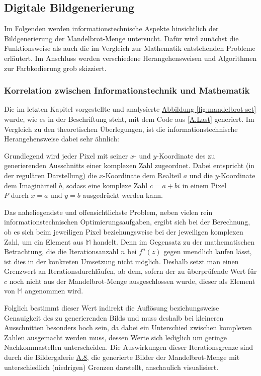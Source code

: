 \subsection{Digitale Bildgenerierung}\label{subsec:digital-generation}

Im Folgenden werden informationstechnische Aspekte hinsichtlich der Bildgenerierung
der Mandelbrot-Menge untersucht.
Dafür wird zunächst die Funktionsweise als auch die im Vergleich zur Mathematik
entstehenden Probleme erläutert.
Im Anschluss werden verschiedene Herangehensweisen und Algorithmen zur Farbkodierung
grob skizziert.

\subsubsection{Korrelation zwischen Informationstechnik und Mathematik}
\label{subsubsec:correlation-between-it-and-mathematics}

Die im letzten Kapitel vorgestellte und analysierte \hyperref[fig:mandelbrot-set]
{Abbildung \ref{fig:mandelbrot-set}} wurde,
wie es in der Beschriftung steht, mit dem Code aus \hyperref[app:last]{[A.Last]}
generiert.
Im Vergleich zu den theoretischen Überlegungen, ist die
informationstechnische Herangehensweise dabei sehr ähnlich:

Grundlegend wird jeder Pixel mit seiner $x$- und $y$-Koordinate des zu generierenden
Ausschnitts einer komplexen Zahl zugeordnet.
Dabei entspricht (in der regulären Darstellung) die $x$-Koordinate dem Realteil
$a$ und die $y$-Koordinate dem Imagin\"arteil $b$, sodass eine komplexe Zahl
$c = a + bi$ in einem Pixel $P \text{ durch } x = a \text{ und } y = b$ ausgedrückt
werden kann.

Das naheliegendste und offensichtlichste Problem,
neben vielen rein informationstechnischen Optimierungsaufgaben,
ergibt sich bei der Berechnung, ob es sich beim jeweiligen Pixel
beziehungsweise bei der jeweiligen komplexen Zahl, um ein Element aus
$\mathbb{M}$ handelt.
Denn im Gegensatz zu der mathematischen Betrachtung, die die Iterationsanzahl
$n$ bei $f^n(z)$ gegen unendlich laufen lässt, ist dies in der konkreten Umsetzung
nicht möglich.
Deshalb setzt man einen Grenzwert an Iterationsdurchläufen, ab dem, sofern der zu
überprüfende Wert für $c$ noch nicht aus der Mandelbrot-Menge ausgeschlossen wurde,
dieser als Element von $\mathbb{M}$ angenommen wird.

Folglich bestimmt dieser Wert indirekt die Auflösung beziehungsweise Genauigkeit
des zu generierenden Bilds und muss deshalb bei kleineren Ausschnitten besonders
hoch sein, da dabei ein Unterschied zwischen komplexen Zahlen ausgemacht werden
muss, dessen Werte sich lediglich um geringe Nachkommastellen unterscheiden.
Die Auswirkungen dieser Iterationsgrenze sind durch die Bildergalerie
\hyperref[app:8]{A.8}, die generierte Bilder der Mandelbrot-Menge
mit unterschiedlich (niedrigen) Grenzen darstellt, anschaulich visualisiert.